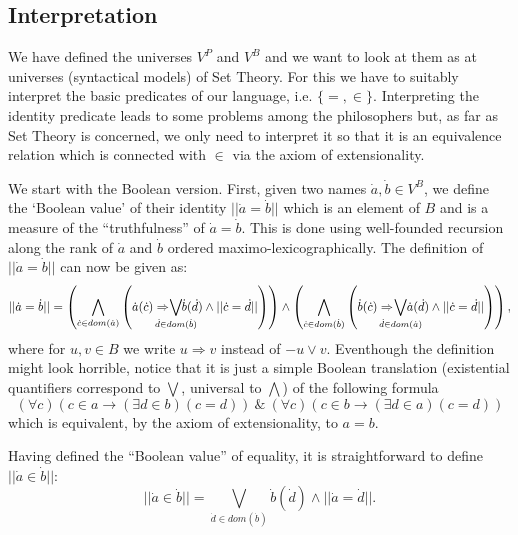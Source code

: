 
\subsection{Interpretation}
We have defined the universes $V^P$ and $V^B$ and we want to look at them as at
universes (syntactical models) of Set Theory. For this we have to suitably interpret
the basic predicates of our language, i.e. $\{=,\in\}$. Interpreting the identity predicate
leads to some problems among the philosophers but, as far as Set Theory is concerned, we only
need to interpret it so that it is an equivalence relation which is connected with $\in$ via
the axiom of extensionality.

We start with the Boolean version. First, given two names $\dot{a},\dot{b}\in V^B$, we define
the `Boolean value' of their identity $||\dot{a}=\dot{b}||$ which is an element of $B$ and is a measure of the
``truthfulness'' of $\dot{a}=\dot{b}$. This is done using well-founded recursion along the rank of $\dot{a}$ and $\dot{b}$
ordered maximo-lexicographically. The definition of $||\dot{a}=\dot{b}||$ can now be
given as:
$$
||\dot{a}=\dot{b}||=\left(\bigwedge_{\dot{c}\in dom(\dot{a})} \left(\dot{a}(\dot{c})\Rightarrow\hskip-0.5cm \bigvee_{\dot{d}\in dom(\dot{b})}\hskip-0.5cm\dot{b}(\dot{d})\wedge ||\dot{c}=\dot{d}||\right)\right)\wedge
        \left(\bigwedge_{\dot{c}\in dom(\dot{b})} \left(\dot{b}(\dot{c})\Rightarrow\hskip-0.5cm \bigvee_{\dot{d}\in dom(\dot{a})}\hskip-0.5cm \dot{a}(\dot{d})\wedge
         ||\dot{c}=\dot{d}||\right)\right),
$$
where for $u,v\in B$ we write $u\Rightarrow v$ instead of $-u\vee v$. Eventhough the definition
might look horrible, notice that it is just a simple Boolean translation (existential quantifiers
correspond to $\bigvee$, universal to $\bigwedge$) of the following formula
$$
(\forall c)(c\in a\rightarrow(\exists d\in b)(c=d))\ \&\ (\forall c)(c\in b\rightarrow(\exists d\in a)(c=d))
$$
which is equivalent, by the axiom of extensionality, to $a=b$.

Having defined the ``Boolean value'' of equality, it is straightforward to define $||\dot{a}\in \dot{b}||$:
$$
||\dot{a}\in \dot{b}||=\bigvee_{\dot{d}\in dom(\dot{b})} \dot{b}(\dot{d})\wedge ||\dot{a}=\dot{d}||.
$$


